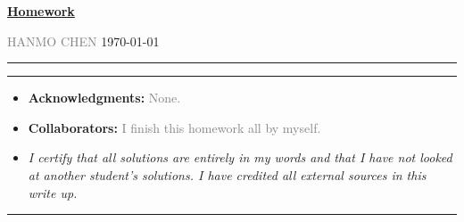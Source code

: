 \documentclass[a4paper]{article}
\begin{document}
\courseheader



\setcounter{hwcnt}{5} %

\begin{center}
  \underline{\bf Homework \thehwcnt} \\
\end{center}
\begin{flushleft}
  \textcolor{gray}{HANMO CHEN}\hfill
  \today
\end{flushleft}
\hrule

\vspace{2em}


\newcommand{\EX}{\mathbb{E}}
\newcommand{\x}{\mathsf{x}}
\newcommand{\y}{\mathsf{y}}

\flushleft
\rule{\textwidth}{1pt}
\begin{itemize}
\item {\bf Acknowledgments: \/} 
  \textcolor{gray}{None.}

\item {\bf Collaborators: \/}
  \textcolor{gray}{I finish this homework all by myself.} 
\item  \emph{I certify that all solutions are entirely in my words and that I have not looked at another student's solutions. I have credited all external sources in this write up.}


  \framebox[\linewidth]{\rule{0pt}{10pt}\textcolor{gray}{\large Hanmo Chen}}
\end{itemize}
\rule{\textwidth}{1pt}
\end{document}
